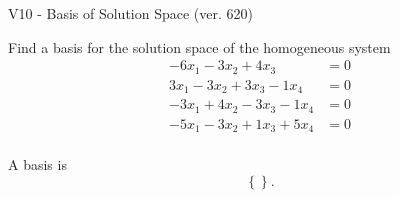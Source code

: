 \begin{exercise}
  \begin{exerciseTitle}V10 - Basis of Solution Space (ver. 620)\end{exerciseTitle}
  \begin{exerciseStatement}
    Find a basis for the solution space of the homogeneous system 
\begin{align*}
 -6 x_ 1 -3 x_ 2 + 4 x_ 3 &= 0  \\ 
  3 x_ 1 -3 x_ 2 + 3 x_ 3 -1 x_ 4 &= 0  \\ 
  -3 x_ 1 + 4 x_ 2 -3 x_ 3 -1 x_ 4 &= 0  \\ 
  -5 x_ 1 -3 x_ 2 + 1 x_ 3 + 5 x_ 4 &= 0  \\ 
 \end{align*}


 
  \end{exerciseStatement}

  \begin{exerciseAnswer}
   A basis is   
\[\left\{\right\}.\]

  


  \end{exerciseAnswer}
\end{exercise}